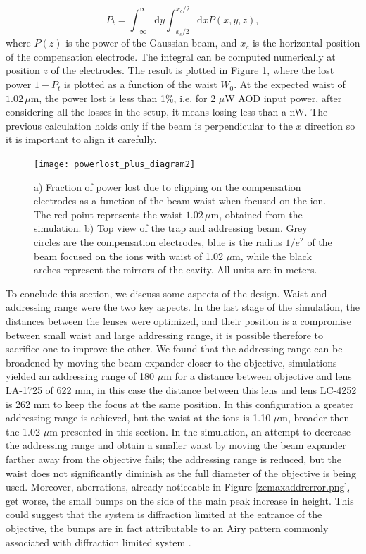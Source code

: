 \begin{equation}
P_{t} = \int_{-\infty}^{\infty}\text{d}y \int_{-x_c/2}^{x_c/2}\text{d}x P(x,y,z),
\end{equation}
where $P(z)$ is the power of the Gaussian beam, and $x_c$ is the horizontal position of the compensation electrode. The integral can be computed numerically at position $z$ of the electrodes. The result is plotted in Figure \ref{lossesplot}, where the lost power $1-P_{t}$ is plotted as a function of the waist $W_0$. At the expected waist of $1.02\,\mu$m, the power lost is less than 1\%, i.e. for 2 $\mu$W AOD input power, after considering all the losses in the setup, it means losing less than a nW. The previous calculation holds only if the beam is perpendicular to the $x$ direction so it is important to align it carefully.\par
\begin{figure}
       \centering
         \texttt{[image: powerlost\_plus\_diagram2]}
         \caption{a) Fraction of power lost due to clipping on the compensation electrodes as a function of the beam waist when focused on the ion. The red point represents the waist $1.02\,\mu$m, obtained from the simulation. b) Top view of the trap and addressing beam. Grey circles are the compensation electrodes, blue is the radius $1/e^2$ of the beam focused on the ions with waist of 1.02 $\mu$m, while the black arches represent the mirrors of the cavity. All units are in meters.}
         \label{lossesplot}
 \end{figure}
To conclude this section, we discuss some aspects of the design. Waist and addressing range were the two key aspects. In the last stage of the simulation, the distances between the lenses were optimized, and their position is a compromise between small waist and large addressing range, it is possible therefore to sacrifice one to improve the other. We found that the addressing range can be broadened by moving the beam expander closer to the objective, simulations yielded an addressing range of 180 $\mu$m for a distance between objective and lens LA-1725 of 622 mm, in this case the distance between this lens and lens LC-4252 is 262 mm to keep the focus at the same position. In this configuration a greater addressing range is achieved, but the waist at the ions is 1.10 $\mu$m, broader then the 1.02 $\mu$m presented in this section. In the simulation, an attempt to decrease the addressing range and obtain a smaller waist by moving the beam expander farther away from the objective fails; the addressing range is reduced, but the waist does not significantly diminish as the full diameter of the objective is being used. Moreover, aberrations, already noticeable in Figure \ref{zemaxaddrerror.png}, get worse, the small bumps on the side of the main peak increase in height. This could suggest that the system is diffraction limited at the entrance of the objective, the bumps are in fact attributable to an Airy pattern commonly associated with diffraction limited system \cite{dlimited}.
